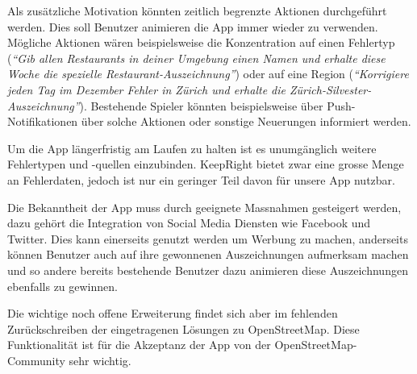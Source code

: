 Als zusätzliche Motivation könnten zeitlich begrenzte Aktionen durchgeführt werden.
Dies soll Benutzer animieren die App immer wieder zu verwenden. 
Mögliche Aktionen wären beispielsweise die Konzentration auf einen Fehlertyp (\emph{"`Gib allen Restaurants in deiner Umgebung einen Namen und erhalte diese Woche die spezielle Restaurant-Auszeichnung"'}) oder auf eine Region (\emph{"`Korrigiere jeden Tag im Dezember Fehler in Zürich und erhalte die Zürich-Silvester-Auszeichnung"'}).
Bestehende Spieler könnten beispielsweise über Push-Notifikationen über solche Aktionen oder sonstige Neuerungen informiert werden.

Um die App längerfristig am Laufen zu halten ist es unumgänglich weitere Fehlertypen und -quellen einzubinden. 
KeepRight bietet zwar eine grosse Menge an Fehlerdaten, jedoch ist nur ein geringer Teil davon für unsere App nutzbar.

Die Bekanntheit der App muss durch geeignete Massnahmen gesteigert werden, dazu gehört die Integration von Social Media Diensten wie Facebook und Twitter.
Dies kann einerseits genutzt werden um Werbung zu machen, anderseits können Benutzer auch auf ihre gewonnenen Auszeichnungen aufmerksam machen und so andere bereits bestehende Benutzer dazu animieren diese Auszeichnungen ebenfalls zu gewinnen.

Die wichtige noch offene Erweiterung findet sich aber im fehlenden Zurückschreiben der eingetragenen Lösungen zu \gls{OpenStreetMap}.
Diese Funktionalität ist für die Akzeptanz der App von der \gls{OpenStreetMap}-Community sehr wichtig.